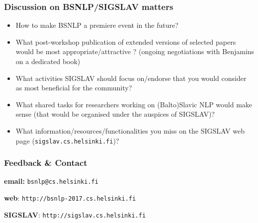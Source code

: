 \documentclass{beamer}
\begin{document}
\begin{frame}[fragile]
 \frametitle{Discussion on BSNLP/SIGSLAV matters}
 
\begin{itemize}

\item How to make {\color{red}BSNLP a premiere event} in the future?

\vspace{0.2cm}

\item What {\color{red}post-workshop publication} of extended versions of selected papers would be most appropriate/attractive ? (ongoing negotiations with Benjamins on a dedicated book)

\vspace{0.2cm}

\item What {\color{red}activities SIGSLAV} should focus on/endorse that you would consider as most beneficial for the community?

\vspace{0.2cm}

\item What {\color{red}shared tasks} for researchers working on (Balto)Slavic NLP would make sense (that would be organised {\color{red}under the auspices of SIGSLAV})?

\vspace{0.2cm}

\item What {\color{red}information/resources/functionalities} you miss on the {\color{red}SIGSLAV web page} ({\color{darkblue}\verb+sigslav.cs.helsinki.fi+})?

\end{itemize}

\end{frame}



\begin{frame}[fragile]
 \frametitle{Feedback \& Contact}

\textbf{email:} {\color{blue} \large{\verb+bsnlp@cs.helsinki.fi+}}

\vspace{1cm}

\textbf{web}: {\color{blue} \large{\verb+http://bsnlp-2017.cs.helsinki.fi+}}

\vspace{1cm}

\textbf{SIGSLAV}: {\color{blue} \large{\verb+http://sigslav.cs.helsinki.fi+}}


\end{frame}
\end{document}
